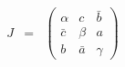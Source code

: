 \begin{equation}
      \begin{array}{ccc} 
	J &
	= &
	\left(\begin{array}{ccc}
	\alpha & c & \bar{b} \\
	\bar{c} & \beta & a \\
	b & \bar{a} & \gamma
	\end{array}\right)
	\end{array}              \label{eq:uc}
\end{equation}

